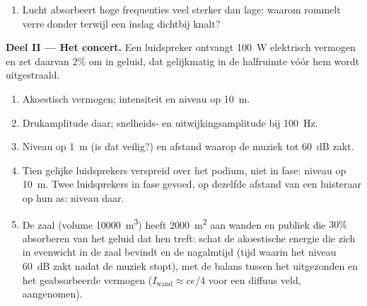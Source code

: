 \begin{problem}
\begin{enumerate}
  \item Lucht absorbeert hoge frequenties veel sterker dan lage: waarom
        rommelt verre donder terwijl een inslag dichtbij knalt?
\end{enumerate}

\medskip
\noindent\textbf{Deel II --- Het concert.}
Een luidspreker ontvangt \qty{100}{W} elektrisch vermogen en zet daarvan
$2\%$ om in geluid, dat gelijkmatig in de halfruimte vóór hem wordt
uitgestraald.
\begin{enumerate}[resume]
  \item Akoestisch vermogen; intensiteit en niveau op \qty{10}{m}.
  \item Drukamplitude daar; snelheids- en uitwijkingsamplitude bij \qty{100}{Hz}.
  \item Niveau op \qty{1}{m} (is dat veilig?) en afstand waarop de muziek
        tot \qty{60}{dB} zakt.
  \item Tien gelijke luidsprekers verspreid over het podium, niet in fase:
        niveau op \qty{10}{m}. Twee luidsprekers in fase gevoed, op dezelfde
        afstand van een luisteraar op hun as: niveau daar.
  \item De zaal (volume \qty{10000}{m^3}) heeft \qty{2000}{m^2} aan wanden
        en publiek die $30\%$ absorberen van het geluid dat hen treft: schat
        de akoestische energie die zich in evenwicht in de zaal bevindt en
        de nagalmtijd (tijd waarin het niveau \qty{60}{dB} zakt nadat de
        muziek stopt), met de balans tussen het uitgezonden en het
        geabsorbeerde vermogen ($I_{\text{wand}} \approx ce/4$ voor een
        diffuus veld, aangenomen).
\end{enumerate}


\end{problem}
